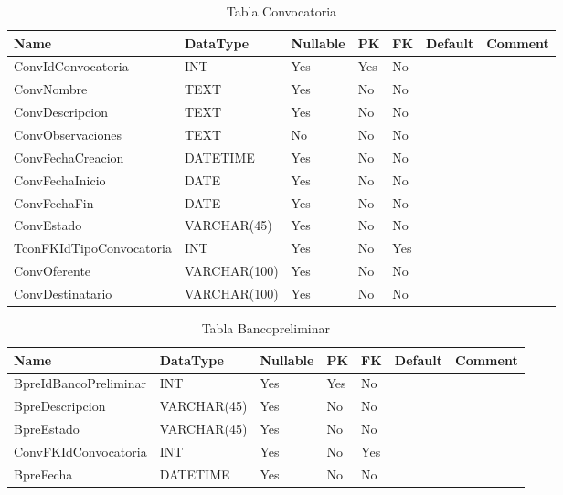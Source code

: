 \begin{table}
	\caption{Tabla Convocatoria}
	\label{labelTableConvocatoria}
	\begin{tabular}{ |l|l|l|l|l|l|l| }
		\hline
		Name & DataType & Nullable & PK & FK & Default & Comment \\ \hline
		ConvIdConvocatoria & INT & Yes & Yes & No &  & \\ \hline 
		ConvNombre & TEXT & Yes & No & No &  & \\ \hline 
		ConvDescripcion & TEXT & Yes & No & No &  & \\ \hline 
		ConvObservaciones & TEXT & No & No & No &  & \\ \hline 
		ConvFechaCreacion & DATETIME & Yes & No & No &  & \\ \hline 
		ConvFechaInicio & DATE & Yes & No & No &  & \\ \hline 
		ConvFechaFin & DATE & Yes & No & No &  & \\ \hline 
		ConvEstado & VARCHAR(45) & Yes & No & No &  & \\ \hline 
		TconFKIdTipoConvocatoria & INT & Yes & No & Yes &  & \\ \hline 
		ConvOferente & VARCHAR(100) & Yes & No & No &  & \\ \hline 
		ConvDestinatario & VARCHAR(100) & Yes & No & No &  & \\ \hline 
		
	\end{tabular}
\end{table}


\begin{table}
	\caption{Tabla Bancopreliminar}
	\label{labelTableBancopreliminar}
	\begin{tabular}{ |l|l|l|l|l|l|l| }
		\hline
		Name & DataType & Nullable & PK & FK & Default & Comment \\ \hline
		BpreIdBancoPreliminar & INT & Yes & Yes & No &  & \\ \hline 
		BpreDescripcion & VARCHAR(45) & Yes & No & No &  & \\ \hline 
		BpreEstado & VARCHAR(45) & Yes & No & No &  & \\ \hline 
		ConvFKIdConvocatoria & INT & Yes & No & Yes &  & \\ \hline 
		BpreFecha & DATETIME & Yes & No & No &  & \\ \hline 
		
	\end{tabular}
\end{table}


